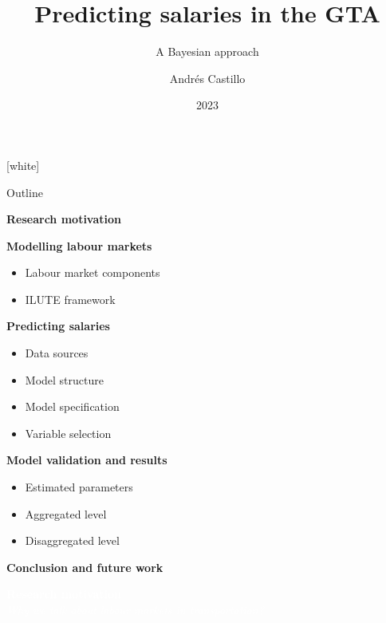 \documentclass[aspectratio=169, xcolor=dvipsnames]{beamer}
\title{Predicting salaries in the GTA}
\subtitle{A Bayesian approach}
\author{Andrés Castillo}
\institute{University of Toronto}
\date{2023}
\begin{document}
\renewcommand{\eqnhighlightshade}{47}

{
[white]
\begin{frame}
  \titlepage
\end{frame}
}

\begin{frame}{Outline}
    \vspace*{-30pt}
    \begin{enumerate}
        {\normalsize
            \item \textbf{Research motivation}
            \item \textbf{Modelling labour markets}
            \begin{itemize}
                \item Labour market components
                \item ILUTE framework
            \end{itemize}
            \item \textbf{Predicting salaries}
            \begin{itemize}
                \item Data sources
                \item Model structure
                \item Model specification
                \item Variable selection
            \end{itemize}
            \item \textbf{Model validation and results}
            \begin{itemize}
                \item Estimated parameters
                \item Aggregated level
                \item Disaggregated level
            \end{itemize}
            \item \textbf{Conclusion and future work}
        }
    \end{enumerate}
\end{frame}

{
\begin{frame}
    \begin{center}
        \textcolor{white}{{\fontsize{22pt}{14pt}\selectfont \textbf{Research motivation}}}\\
        \vspace{20pt}
        \textcolor{white}{{\fontsize{14pt}{10pt}\selectfont \textsl{Why we talk about labour markets in transportation?}}}
    \end{center}
\end{frame}
}
\end{document}
